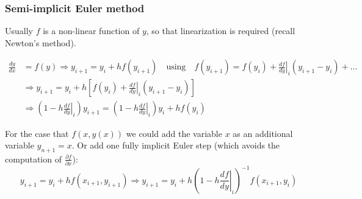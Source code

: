 \documentclass[11pt,table,final,fleqn,xcolor={usenames,dvipsnames,table}]{beamer}
\begin{document}
\begin{frame}
  \frametitle{Semi-implicit Euler method}
  \footnotesize\selectfont
  Usually $f$ is a non-linear function of $y$, so that linearization is required (recall Newton's method).
  
  \begin{align*}
    \frac{dy}{dx} &= f(y) \Rightarrow y_{i+1} = y_i + h f (y_{i+1}) \quad \text{using} \quad f(y_{i+1}) = f(y_i) + \left.\frac{df}{dy}\right|_i(y_{i+1}-y_i) + \ldots \\
  &\Rightarrow y_{i+1} =  y_i + h \left[ f(y_i) + \left.\frac{df}{dy}\right|_i (y_{i+1}-y_i) \right] \\ 
  &\Rightarrow \left(1-h\left.\frac{df}{dy}\right|_i \right)y_{i+1} = \left(1-h\left.\frac{df}{dy}\right|_i\right)y_i + h f(y_i) 
  \end{align*}
  
  \pause
  For the case that $f(x,y(x))$ we could add the variable $x$ as an additional variable $y_{n+1}=x$. Or add one fully implicit Euler step (which avoids the computation of $\frac{\partial f}{\partial x}$): \vspace*{-1em}
  \[
    y_{i+1} = y_i + h f(x_{i+1},y_{i+1}) \Rightarrow y_{i+1} = y_i + h \left(1-h\left.\frac{df}{dy}\right|_i \right)^{-1} f(x_{i+1},y_i)
  \]
\end{frame}

\end{document}

